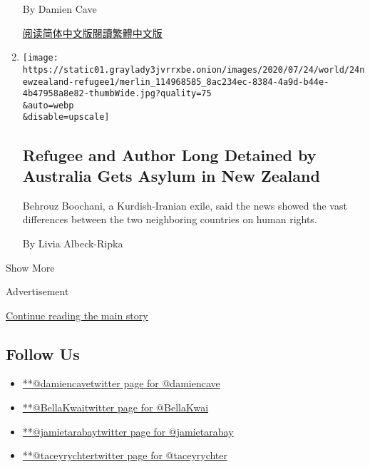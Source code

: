 \begin{enumerate}
  By Damien Cave

  \href{https://cn.nytimes3xbfgragh.onion/asia-pacific/20200729/chinese-students-virtual-kidnapping/}{阅读简体中文版}\href{https://cn.nytimes3xbfgragh.onion/asia-pacific/20200729/chinese-students-virtual-kidnapping/zh-hant/}{閱讀繁體中文版}
\item
  \href{/2020/07/24/world/australia/behrouz-boochani-asylum-new-zealand.html}{}

  \texttt{[image: https://static01.graylady3jvrrxbe.onion/images/2020/07/24/world/24newzealand-refugee1/merlin\_114968585\_8ac234ec-8384-4a9d-b44e-4b47958a8e82-thumbWide.jpg?quality=75\\\&auto=webp\\\&disable=upscale]}

  \hypertarget{refugee-and-author-long-detained-by-australia-gets-asylum-in-new-zealand}{%
  \subsection{Refugee and Author Long Detained by Australia Gets Asylum
  in New
  Zealand}\label{refugee-and-author-long-detained-by-australia-gets-asylum-in-new-zealand}}

  Behrouz Boochani, a Kurdish-Iranian exile, said the news showed the
  vast differences between the two neighboring countries on human
  rights.

  By Livia Albeck-Ripka
\end{enumerate}

Show More

Advertisement

\protect\hyperlink{after-mid1}{Continue reading the main story}

\hypertarget{follow-us}{%
\subsection{Follow Us}\label{follow-us}}

\begin{itemize}
\tightlist
\item
  \href{https://twitter.com/damiencave}{**@damiencavetwitter page for
  @damiencave}
\item
  \href{https://twitter.com/BellaKwai}{**@BellaKwaitwitter page for
  @BellaKwai}
\item
  \href{https://twitter.com/jamietarabay}{**@jamietarabaytwitter page
  for @jamietarabay}
\item
  \href{https://twitter.com/taceyrychter}{**@taceyrychtertwitter page
  for @taceyrychter}
\end{itemize}

